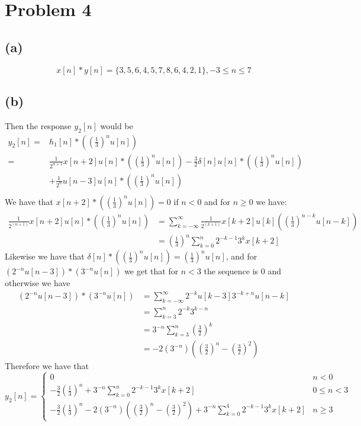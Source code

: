 \section*{Problem 4}
\subsection*{(a)}
$$x[n]*y[n]=\boxed{\{3, 5, 6, 4, 5, 7, 8, 6, 4, 2, 1\},-3\leq n \leq 7}$$
\subsection*{(b)}
Then the response $y_2[n]$ would be 
\begin{align*}
y_2[n]=&h_1[n]*\left(\left(\frac{1}{3}\right)^nu[n]\right)\\
=&\frac{1}{2^{n+1}}x[n+2]u[n]*\left(\left(\frac{1}{3}\right)^nu[n]\right)-\frac{3}{2}
\delta[n]u[n]*\left(\left(\frac{1}{3}\right)^nu[n]\right)\\
&+\frac{1}{2^n}u[n-3]u[n]*\left(\left(\frac{1}{3}\right)^nu[n]\right)\\
\end{align*}
We have that $x[n+2]*\left(\left(\frac{1}{3}\right)^nu[n]\right)=0$ 
if $n<0$ and for $n\geq 0$ we have:
\begin{align*}
    \frac{1}{2^(n+1)}x[n+2]u[n]*\left(\left(\frac{1}{3}\right)^nu[n]\right)&=\sum_{k=-\infty}^{\infty}\frac{1}{2^{(k+1)}}x[k+2]u[k]\left(\left(\frac{1}{3}\right)^{n-k}u[n-k]\right)\\
    &=\left(\frac{1}{3}\right)^n\sum_{k=0}^{n}2^{-k-1} 3^{k}x[k+2]
\end{align*}
Likewise we have that $\delta[n]*\left(\left(\frac{1}{3}\right)^nu[n]\right)=\left(\frac{1}{3}\right)^nu[n]$, and 
for $ \left(2^{-n}u[n-3]\right)*\left(3^{-n}u[n]\right)$ we get that for $n<3$ the sequence is $0$ and otherwise we have
\begin{align*}
    \left(2^{-n}u[n-3]\right)*\left(3^{-n}u[n]\right)&=\sum_{k=-\infty}^{\infty}2^{-k}u[k-3]3^{-k+n}u[n-k]\\
    &=\sum_{k=3}^{n}2^{-k}3^{k-n}\\
    &=3^{-n}\sum_{k=3}^{n}\left(\frac{3}{2}\right)^{k}\\
    &=-2\left(3^{-n}\right)\left(\left(\frac{3}{2}\right)^n-\left(\frac{3}{2}\right)^2\right)
\end{align*}
Therefore we have that 
$$y_2[n]=\boxed{\begin{cases}
    0 & n<0\\
    -\frac{3}{2}\left(\frac{1}{3}\right)^n+3^{-n}\sum_{k=0}^{n}2^{-k-1} 3^{k}x[k+2] & 0\leq n<3\\
    -\frac{3}{2}\left(\frac{1}{3}\right)^n-2\left(3^{-n}\right)\left(\left(\frac{3}{2}\right)^n-\left(\frac{3}{2}\right)^2\right)+3^{-n}\sum_{k=0}^{4}2^{-k-1} 3^{k}x[k+2] & n\geq 3
\end{cases}}$$
